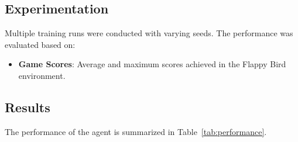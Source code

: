 \documentclass[a4paper,12pt]{article}
\begin{document}
\subsection{Experimentation}
Multiple training runs were conducted with varying seeds. The performance was evaluated based on:
\begin{itemize}
    \item \textbf{Game Scores}: Average and maximum scores achieved in the Flappy Bird environment.
\end{itemize}

\subsection{Results}
The performance of the agent is summarized in Table~\ref{tab:performance}.
\end{document}
